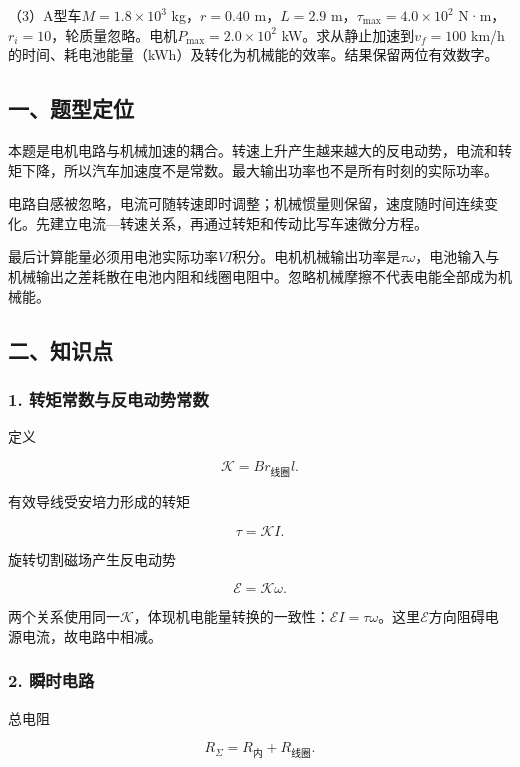 \documentclass[12pt,a4paper,fontset=fandol]{ctexart}
\begin{document}
（3）A型车\(M=1.8\times10^3\) kg，\(r=0.40\) m，\(L=2.9\)
m，\(\tau_{\max}=4.0\times10^2\)
N·m，\(r_i=10\)，轮质量忽略。电机\(P_{\max}=2.0\times10^2\)
kW。求从静止加速到\(v_f=100\)
km/h的时间、耗电池能量（kWh）及转化为机械能的效率。结果保留两位有效数字。

\subsection{一、题型定位}\label{ux4e00ux9898ux578bux5b9aux4f4d-7}

本题是电机电路与机械加速的耦合。转速上升产生越来越大的反电动势，电流和转矩下降，所以汽车加速度不是常数。最大输出功率也不是所有时刻的实际功率。

电路自感被忽略，电流可随转速即时调整；机械惯量则保留，速度随时间连续变化。先建立电流---转速关系，再通过转矩和传动比写车速微分方程。

最后计算能量必须用电池实际功率\(VI\)积分。电机机械输出功率是\(\tau\omega\)，电池输入与机械输出之差耗散在电池内阻和线圈电阻中。忽略机械摩擦不代表电能全部成为机械能。

\subsection{二、知识点}\label{ux4e8cux77e5ux8bc6ux70b9-7}

\subsubsection{1.
转矩常数与反电动势常数}\label{ux8f6cux77e9ux5e38ux6570ux4e0eux53cdux7535ux52a8ux52bfux5e38ux6570}

定义

\[
\mathcal K=B r_{\text{线圈}}l.
\]

有效导线受安培力形成的转矩

\[
\tau=\mathcal K I.
\]

旋转切割磁场产生反电动势

\[
\mathcal E=\mathcal K\omega.
\]

两个关系使用同一\(\mathcal K\)，体现机电能量转换的一致性：\(\mathcal EI=\tau\omega\)。这里\(\mathcal E\)方向阻碍电源电流，故电路中相减。

\subsubsection{2. 瞬时电路}\label{ux77acux65f6ux7535ux8def}

总电阻

\[
R_\Sigma=R_{\text{内}}+R_{\text{线圈}}.
\]
\end{document}
